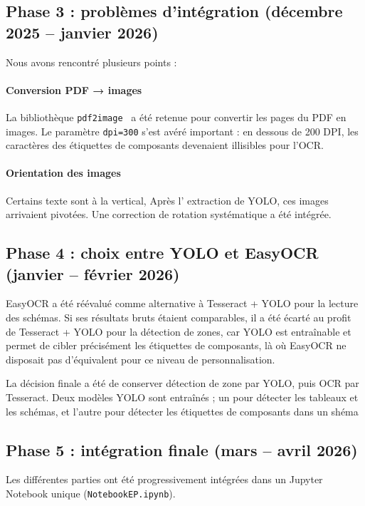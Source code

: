 \documentclass[a4paper,11pt]{article} %
\begin{document}
\subsection{Phase 3 : problèmes d'intégration (décembre 2025 -- janvier 2026)}

Nous avons rencontré plusieurs points :

\paragraph{Conversion PDF → images}
La bibliothèque \texttt{pdf2image}~\cite{pdf2image} a été retenue pour convertir les pages du PDF
en images.
Le paramètre \texttt{dpi=300} s'est avéré important : en dessous de 200 DPI, les caractères des étiquettes de composants devenaient illisibles pour l'OCR.

\paragraph{Orientation des images}
Certains texte sont à la vertical, Après l' extraction de YOLO, ces images arrivaient pivotées.
Une correction de rotation systématique a été intégrée.

\subsection{Phase 4 : choix entre YOLO et EasyOCR (janvier -- février 2026)}

EasyOCR a été réévalué comme alternative à Tesseract + YOLO pour la lecture des schémas.
Si ses résultats bruts étaient comparables, il a été écarté au profit de Tesseract + YOLO pour
la détection de zones, car YOLO est entraînable et permet de cibler précisément les
étiquettes de composants, là où EasyOCR ne disposait pas d'équivalent pour ce
niveau de personnalisation.

La décision finale a été de conserver détection de zone par YOLO, puis OCR par Tesseract. Deux modèles YOLO sont entraînés ; un pour détecter les tableaux et les schémas, et l'autre pour détecter les étiquettes de composants dans un shéma

\subsection{Phase 5 : intégration finale (mars -- avril 2026)}

Les différentes parties ont été progressivement intégrées dans un Jupyter Notebook
unique (\texttt{NotebookEP.ipynb}).
\end{document}
